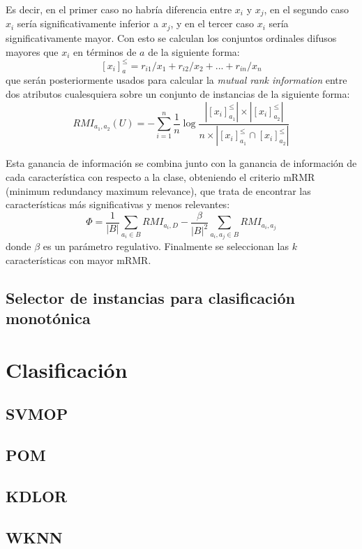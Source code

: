 Es decir, en el primer caso no habría diferencia entre $x_i$ y $x_j$, en el segundo caso $x_i$ sería significativamente inferior a $x_j$, y en el tercer caso $x_i$ sería significativamente mayor. \newline
Con esto se calculan los conjuntos ordinales difusos mayores que $x_i$ en términos de $a$ de la siguiente forma:
$$[x_i]_a^{\leq}=r_{i1}/x_1 + r_{i2}/x_2 +...+r_{in}/x_n$$
que serán posteriormente usados para calcular la \textit{mutual rank information} entre dos atributos cualesquiera sobre un conjunto de instancias de la siguiente forma: 
$$RMI_{a_1,a_2}(U)= -\sum_{i=1}^{n} \frac{1}{n} \log \frac{| [x_i]_{a_1}^{\leq}| \times |[x_i]_{a_2}^{\leq}|  }{ n \times | [x_i]_{a_1}^{\leq} \cap [x_i]_{a_2}^{\leq} |}$$

Esta ganancia de información se combina junto con la ganancia de información de cada característica con respecto a la clase, obteniendo el criterio mRMR (minimum redundancy maximum relevance), que trata de encontrar las características más significativas y menos relevantes:
$$\Phi=\frac{1}{|B|} \sum_{a_i \in B} RMI_{a_i,D} - \frac{\beta}{|B|^2} \sum_{a_i, a_j \in B} RMI_{a_i,a_j} $$ 
donde $\beta$ es un parámetro regulativo. Finalmente se seleccionan las \textit{$k$} características con mayor mRMR.
\subsection{Selector de instancias para clasificación monotónica}

\section{Clasificación}
\subsection{SVMOP}
\subsection{POM}
\subsection{KDLOR}
\subsection{WKNN}



